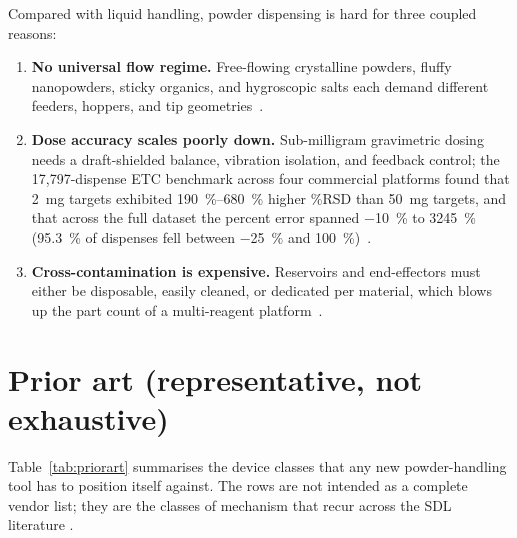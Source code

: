 \documentclass[11pt,a4paper]{article}
\begin{document}
Compared with liquid handling, powder dispensing is hard for three coupled
reasons:

\begin{enumerate}[leftmargin=*]
  \item \textbf{No universal flow regime.} Free-flowing crystalline powders,
    fluffy nanopowders, sticky organics, and hygroscopic salts each demand
    different feeders, hoppers, and tip
    geometries~\cite{yang2007meteringanddispensing,bahr2018collaborativeevaluationof,carruthers2025amobilerobotic}.
  \item \textbf{Dose accuracy scales poorly down.} Sub-milligram gravimetric
    dosing needs a draft-shielded balance, vibration isolation, and feedback
    control; the 17{,}797-dispense ETC benchmark across four commercial
    platforms found that \SI{2}{\milli\gram} targets exhibited
    \SIrange{190}{680}{\percent} higher \%RSD than \SI{50}{\milli\gram}
    targets, and that across the full dataset the percent error spanned
    \SI{-10}{\percent} to \SI{+3245}{\percent} (\SI{95.3}{\percent} of
    dispenses fell between \SI{-25}{\percent} and
    \SI{+100}{\percent})~\cite{bahr2018collaborativeevaluationof,bahr2020recentadvancesin}.
  \item \textbf{Cross-contamination is expensive.} Reservoirs and
    end-effectors must either be disposable, easily cleaned, or dedicated
    per material, which blows up the part count of a multi-reagent
    platform~\cite{tom2024selfdrivinglaboratoriesfor,carruthers2025amobilerobotic}.
\end{enumerate}

\section{Prior art (representative, not exhaustive)}
\label{sec:priorart}

Table~\ref{tab:priorart} summarises the device classes that any new
powder-handling tool has to position itself against. The rows are not
intended as a complete vendor list; they are the classes of mechanism that
recur across the SDL literature
\cite{tom2024selfdrivinglaboratoriesfor,yang2007meteringanddispensing,bahr2018collaborativeevaluationof,bahr2020recentadvancesin,jiang2023autonomousbiomimeticsolid,szymanski2023anautonomouslaboratory,fei2024alabosapythonbased,lunt2023modularmultirobotintegration,lunt2024aroboticworkflow,carruthers2025amobilerobotic,alsenz2011powderpickinganinexpensive}.
\end{document}
